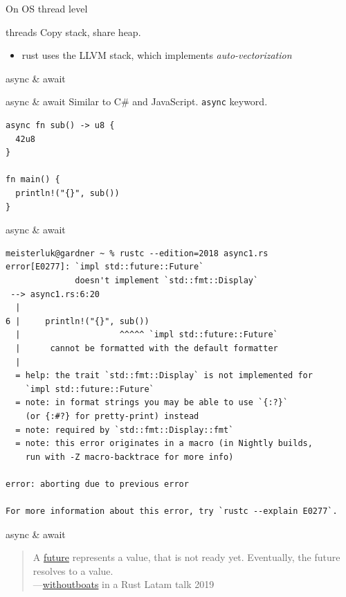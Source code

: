 \documentclass{beamer}
\begin{document}
\begin{frame}[standout]
  On OS thread level
\end{frame}

\begin{frame}[fragile]{threads}
  Copy stack, share heap.
  \begin{itemize}
    \item rust uses the LLVM stack, which implements \emph{auto-vectorization}
  \end{itemize}
\end{frame}

\begin{frame}[standout]
  async \& await
\end{frame}

\begin{frame}[fragile]{async \& await}
  Similar to C\# and JavaScript.
  \texttt{async} keyword. 

  \begin{verbatim}
async fn sub() -> u8 {
  42u8
}

fn main() {
  println!("{}", sub())
}
  \end{verbatim}
\end{frame}

\begin{frame}[fragile]{async \& await}
  \begin{verbatim}
meisterluk@gardner ~ % rustc --edition=2018 async1.rs
error[E0277]: `impl std::future::Future`
              doesn't implement `std::fmt::Display`
 --> async1.rs:6:20
  |
6 |     println!("{}", sub())
  |                    ^^^^^ `impl std::future::Future`
  |      cannot be formatted with the default formatter
  |
  = help: the trait `std::fmt::Display` is not implemented for
    `impl std::future::Future`
  = note: in format strings you may be able to use `{:?}`
    (or {:#?} for pretty-print) instead
  = note: required by `std::fmt::Display::fmt`
  = note: this error originates in a macro (in Nightly builds,
    run with -Z macro-backtrace for more info)

error: aborting due to previous error

For more information about this error, try `rustc --explain E0277`.
  \end{verbatim}
\end{frame}

\begin{frame}[fragile]{async \& await}
  \begin{quote}
  A \href{https://doc.rust-lang.org/std/future/trait.Future.html}{future} represents a value, that is not ready yet. Eventually, the future resolves to a value. \\
  ---\href{https://www.youtube.com/watch?v=skos4B5x7qE}{withoutboats} in a Rust Latam talk 2019
  \end{quote}
\end{frame}
\end{document}
